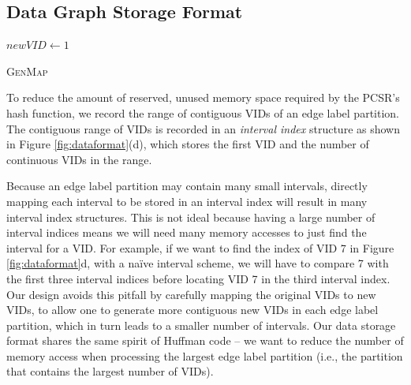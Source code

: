 \subsection{\SystemName Data Graph Storage Format}
\begin{algorithm}[t!]
$newVID \leftarrow 1$\;
\caption{\textsc{GenMap}}
\label{algo:genmap}
\end{algorithm}


To reduce the amount of reserved, unused memory space required by the PCSR's hash function, we record the range of contiguous VIDs of an
edge label partition. The contiguous range of VIDs is recorded in an \emph{interval index} structure as shown in Figure
\ref{fig:dataformat}(d), which stores the first VID and the number of continuous VIDs in the range.

Because an edge label partition may contain many small intervals, directly mapping each interval to be stored in an interval index will
result in many interval index structures. This is not ideal because having a large number of interval indices means we will need many
memory accesses to just find the interval for a VID. For example, if we want to find the index of VID 7 in Figure \ref{fig:dataformat}d,
with a naïve interval scheme, we will have to compare 7 with the first three interval indices before locating VID 7 in the third interval
index. Our design avoids this pitfall by carefully mapping the original VIDs to new VIDs, to allow one to generate more contiguous new VIDs
in each edge label partition, which in turn leads to a smaller number of intervals. Our data storage format shares the same spirit of
Huffman code – we want to reduce the number of memory access when processing the largest edge label partition (i.e., the partition that
contains the largest number of VIDs).

